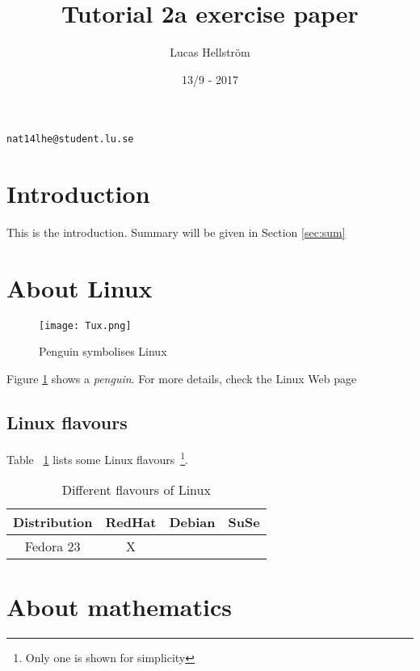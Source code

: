 \documentclass[a4paper]{article}
\title{Tutorial 2a exercise paper}
\author{Lucas Hellström}
\date{13/9 - 2017}
\begin{document}
\maketitle

\begin{center}
	\texttt{nat14lhe@student.lu.se}
\end{center}

\section{Introduction}
\label{sec:intro}

This is the introduction. Summary will be given in Section \ref{sec:sum}

\section{About Linux}

	\begin{figure}[h]
		\centering
		\texttt{[image: Tux.png]}
		\caption{Penguin symbolises Linux}
		\label{fig:penguin}
	\end{figure}

	Figure \ref{fig:penguin} shows a \textit{penguin}. For more details, check the Linux Web page ~\cite{linux}
	
	\subsection{Linux flavours}
	\label{sec:flavours}
		Table ~\ref{tab:flavours} lists some Linux flavours~\footnote{Only one is shown for simplicity}.
	\begin{table}[h]
		\begin{center}
			\begin{tabular}{cccc} \toprule[1.5pt]
				\textbf{Distribution}&RedHat&Debian&SuSe\\ \midrule
				Fedora 23 & X & & \\ \bottomrule[1.5pt]
			\end{tabular}
			\caption{Different flavours of Linux}
			\label{tab:flavours}
		\end{center}
	\end{table}

\section{About mathematics}
\label{sec:math}
\end{document}
